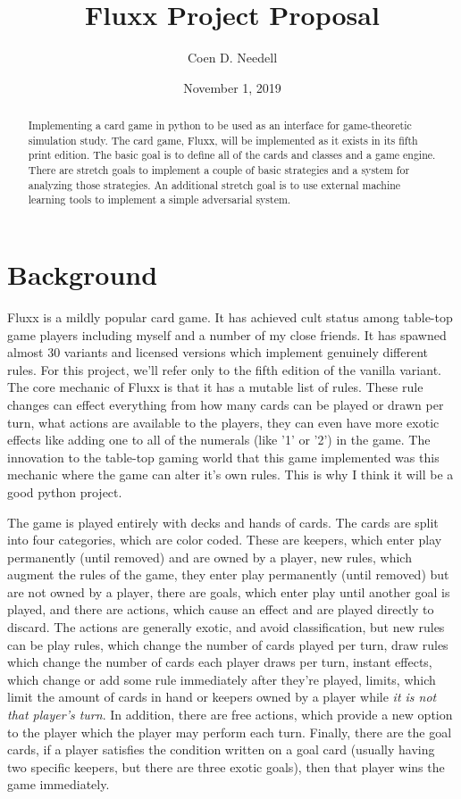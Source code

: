 \documentclass[10pt,letterpaper, twocolumn, science]{revtex4}
\begin{document}
\title{Fluxx Project Proposal}
\author{Coen D. Needell}
\date{November 1, 2019}
\begin{abstract}
Implementing a card game in python to be used as an interface for game-theoretic simulation study. The card game, Fluxx, will be implemented as it exists in its fifth print edition. The basic goal is to define all of the cards and classes and a game engine. There are stretch goals to implement a couple of basic strategies and a system for analyzing those strategies. An additional stretch goal is to use external machine learning tools to implement a simple adversarial system.
\end{abstract}

\maketitle

\section{Background}

Fluxx is a mildly popular card game.\cite{fluxx}\cite{boardgamegeek} It has achieved cult status among table-top game players including myself and a number of my close friends. It has spawned almost 30 variants and licensed versions which implement genuinely different rules. For this project, we'll refer only to the fifth edition of the vanilla variant. The core mechanic of Fluxx is that it has a mutable list of rules. These rule changes can effect everything from how many cards can be played or drawn per turn, what actions are available to the players, they can even have more exotic effects like adding one to all of the numerals (like '1' or '2') in the game. The innovation to the table-top gaming world that this game implemented was this mechanic where the game can alter it's own rules. This is why I think it will be a good python\cite{python} project. 

The game is played entirely with decks and hands of cards. The cards are split into four categories, which are color coded. These are keepers, which enter play permanently (until removed) and are owned by a player, new rules, which augment the rules of the game, they enter play permanently (until removed) but are not owned by a player, there are goals, which enter play until another goal is played, and there are actions, which cause an effect and are played directly to discard. The actions are generally exotic, and avoid classification, but new rules can be play rules, which change the number of cards played per turn, draw rules which change the number of cards each player draws per turn, instant effects, which change or add some rule immediately after they're played, limits, which limit the amount of cards in hand or keepers owned by a player while \emph{it is not that player's turn}. In addition, there are free actions, which provide a new option to the player which the player may perform each turn. Finally, there are the goal cards, if a player satisfies the condition written on a goal card (usually having two specific keepers, but there are three exotic goals), then that player wins the game immediately. 
\end{document}
